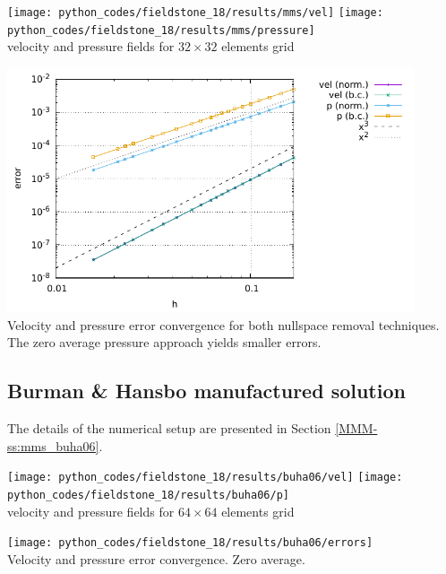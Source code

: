 \begin{center}
\texttt{[image: python\_codes/fieldstone\_18/results/mms/vel]}
\texttt{[image: python\_codes/fieldstone\_18/results/mms/pressure]}\\
{\captionfont velocity and pressure fields for $32\times 32$ elements grid}
\end{center}

\begin{center}
\includegraphics[width=12cm]{python_codes/fieldstone_18/results/mms/errors}\\
{\captionfont Velocity and pressure error convergence for both nullspace removal 
techniques. The zero average pressure approach yields smaller errors.}
\end{center}


\subsection*{Burman \& Hansbo manufactured solution}

The details of the numerical setup are presented in Section \ref{MMM-ss:mms_buha06}.

\begin{center}
\texttt{[image: python\_codes/fieldstone\_18/results/buha06/vel]}
\texttt{[image: python\_codes/fieldstone\_18/results/buha06/p]}\\
{\captionfont velocity and pressure fields for $64\times 64$ elements grid}
\end{center}

\begin{center}
\texttt{[image: python\_codes/fieldstone\_18/results/buha06/errors]}\\
{\captionfont Velocity and pressure error convergence. Zero average.}
\end{center}

